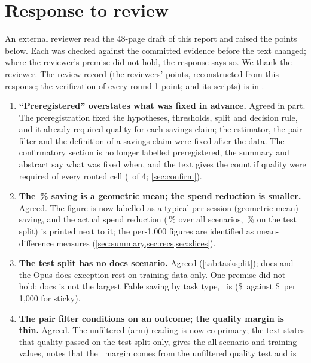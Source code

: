 \section{Response to review}\label{app:review}

An external reviewer read the 48-page draft of this report and raised the points below. Each was checked against
the committed evidence before the text changed; where the reviewer's premise did not hold, the response says so.
We thank the reviewer. The review record (the reviewers' points, reconstructed from this response; the verification of
every round-1 point; and its scripts) is in .

\begin{enumerate}[leftmargin=1.6em]
  \item \textbf{``Preregistered'' overstates what was fixed in advance.} Agreed in part. The preregistration fixed the
    hypotheses, thresholds, split and decision rule, and it already required quality for each savings claim; the
    estimator, the pair filter and the definition of a savings claim were fixed after the data. The confirmatory
    section is no longer labelled preregistered, the summary and abstract say what was fixed when, and the text
    gives the count if quality were required of every routed cell (\RvNHypAllQuality\ of 4; \cref{sec:confirm}).
  \item \textbf{The \CfFableStickySaving\,\% saving is a geometric mean; the spend reduction is smaller.} Agreed. The
    figure is now labelled as a typical per-session (geometric-mean) saving, and the actual spend reduction
    (\RvSpendCutAll\,\% over all scenarios, \RvSpendCutTest\,\% on the test split) is printed next to it; the per-1,000
    figures are identified as mean-difference measures (\cref{sec:summary,sec:recs,sec:slices}).
  \item \textbf{The test split has no docs scenario.} Agreed (\cref{tab:tasksplit}); docs and the Opus docs exception
    rest on training data only. One premise did not hold: docs is not the largest Fable saving by task type,
    \RvBestTaskFableSticky\ is (\$\RvSavReviewFableSticky\ against \$\RvSavDocsFableSticky\ per 1,000 for sticky).
  \item \textbf{The pair filter conditions on an outcome; the quality margin is thin.} Agreed. The unfiltered (arm)
    reading is now co-primary; the text states that quality passed on the test split only, gives the all-scenario
    and training values, notes that the \QFableStickyMarginGap\ margin comes from the unfiltered quality test and is

\end{enumerate}
